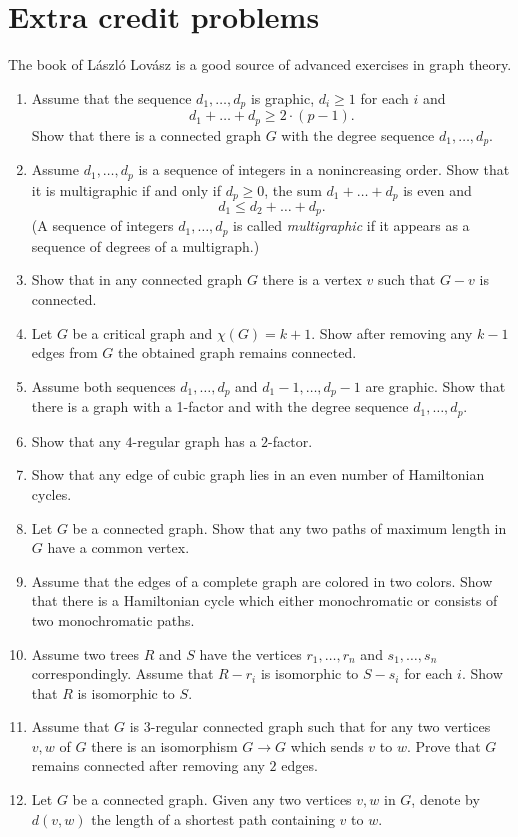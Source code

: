 \chapter{Extra credit problems}

The book of L\'aszl\'o Lov\'asz \cite{lovasz} is a good source of advanced exercises in graph theory.

\begin{enumerate}
\item Assume that the sequence $d_1,\dots, d_p$ is graphic,
$d_i\ge 1$ for each $i$ and 
\[d_1+\dots+d_p\ge 2\cdot(p-1).\]
Show that there is a connected graph $G$ with the degree sequence $d_1,\dots, d_p$.
\item Assume $d_1,\dots, d_p$ is a sequence of integers in a nonincreasing order.
Show that it is multigraphic if and only if $d_p\ge0$, the sum $d_1+\dots+ d_p$ is even and 
\[d_1\le d_2+\dots+d_p.\]
(A sequence of integers $d_1,\dots, d_p$ is called \textit{multigraphic} if it appears as a sequence of degrees of a multigraph.)
\item Show that in any connected graph $G$ there is a vertex $v$ such that $G-v$ is connected.
\item Let $G$ be a critical graph and $\chi(G)=k+1$.
Show after removing any $k-1$ edges from $G$  
the obtained graph remains connected. 
\item Assume both sequences $d_1,\dots, d_p$
 and $d_1-1,\dots, d_p-1$ are graphic.
Show that there is a graph with a 1-factor and with the degree sequence $d_1,\dots, d_p$.
\item Show that any $4$-regular graph has a $2$-factor.
\item Show that any edge of cubic graph lies in an even number of Hamiltonian cycles.
\item Let $G$ be a  connected graph.
Show that any two paths of maximum length in $G$ have a common vertex.
\item Assume that the edges of a complete graph are colored in two colors.
Show that there is a Hamiltonian cycle which either monochromatic or consists of two monochromatic paths.
\item Assume two trees $R$ and $S$ 
have the vertices $r_1,\dots,r_n$ and $s_1,\dots,s_n$ correspondingly.
Assume that $R-r_i$ is isomorphic to $S-s_i$ for each $i$.
Show that $R$ is isomorphic to $S$.
\item Assume that $G$ is $3$-regular connected graph such that 
for any two vertices $v,w$ of $G$ there is an isomorphism
$G\to G$ which sends $v$ to $w$.
Prove that $G$ remains connected after removing any $2$ edges.
\item  Let $G$ be a connected graph.
Given any two vertices $v,w$ in $G$, denote by $d(v,w)$ the length of a shortest path containing $v$ to $w$. 


\end{enumerate}
